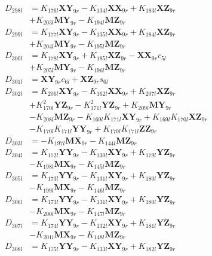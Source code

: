 \begin{align}
D_{298l} &= K_{176l}\mathbf{XY}_{9r} - K_{134l}\mathbf{XX}_{9r} + K_{183l}\mathbf{XZ}_{9r}  \nonumber \\
&+ K_{203l}\mathbf{MY}_{9r} - K_{194l}\mathbf{MZ}_{9r} \nonumber \\
D_{299l} &= K_{177l}\mathbf{XY}_{9r} - K_{135l}\mathbf{XX}_{9r} + K_{184l}\mathbf{XZ}_{9r}  \nonumber \\
&+ K_{204l}\mathbf{MY}_{9r} - K_{195l}\mathbf{MZ}_{9r} \nonumber \\
D_{300l} &= K_{178l}\mathbf{XY}_{9r} + K_{185l}\mathbf{XZ}_{9r} - \mathbf{XX}_{9r}c_{5l}  \nonumber \\
&+ K_{205l}\mathbf{MY}_{9r} - K_{196l}\mathbf{MZ}_{9r} \nonumber \\
D_{301l} &= \mathbf{XY}_{9r}c_{6l} + \mathbf{XZ}_{9r}s_{6l} \nonumber \\
D_{302l} &= K_{206l}\mathbf{XY}_{9r} - K_{162l}\mathbf{XX}_{9r} + K_{207l}\mathbf{XZ}_{9r}  \nonumber \\
&+ K_{170l}^2\mathbf{YZ}_{9r} - K_{171l}^2\mathbf{YZ}_{9r} + K_{209l}\mathbf{MY}_{9r}  \nonumber \\
&- K_{208l}\mathbf{MZ}_{9r} - K_{169l}K_{171l}\mathbf{XY}_{9r} + K_{169l}K_{170l}\mathbf{XZ}_{9r}  \nonumber \\
&- K_{170l}K_{171l}\mathbf{YY}_{9r} + K_{170l}K_{171l}\mathbf{ZZ}_{9r} \nonumber \\
D_{303l} &= - K_{197l}\mathbf{MX}_{9r} - K_{144l}\mathbf{MZ}_{9r} \nonumber \\
D_{304l} &= K_{172l}\mathbf{YY}_{9r} - K_{130l}\mathbf{XY}_{9r} + K_{179l}\mathbf{YZ}_{9r}  \nonumber \\
&- K_{198l}\mathbf{MX}_{9r} - K_{145l}\mathbf{MZ}_{9r} \nonumber \\
D_{305l} &= K_{173l}\mathbf{YY}_{9r} - K_{131l}\mathbf{XY}_{9r} + K_{180l}\mathbf{YZ}_{9r}  \nonumber \\
&- K_{199l}\mathbf{MX}_{9r} - K_{146l}\mathbf{MZ}_{9r} \nonumber \\
D_{306l} &= K_{173l}\mathbf{YY}_{9r} - K_{131l}\mathbf{XY}_{9r} + K_{180l}\mathbf{YZ}_{9r}  \nonumber \\
&- K_{200l}\mathbf{MX}_{9r} - K_{147l}\mathbf{MZ}_{9r} \nonumber \\
D_{307l} &= K_{174l}\mathbf{YY}_{9r} - K_{132l}\mathbf{XY}_{9r} + K_{181l}\mathbf{YZ}_{9r}  \nonumber \\
&- K_{201l}\mathbf{MX}_{9r} - K_{148l}\mathbf{MZ}_{9r} \nonumber \\
D_{308l} &= K_{175l}\mathbf{YY}_{9r} - K_{133l}\mathbf{XY}_{9r} + K_{182l}\mathbf{YZ}_{9r}  \nonumber \\

\end{align}
